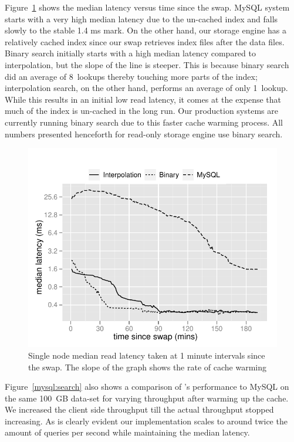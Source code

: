 Figure~\ref{search} shows the median latency versus time since the swap.
MySQL system starts with a very high median latency due to the un-cached
index and falls slowly to the stable 1.4 ms mark. On the other hand, our
storage engine has a relatively cached index since our swap retrieves index
files after the data files. Binary search initially starts with a high 
median latency compared to interpolation, but the slope of the line 
is steeper. This is because binary search did an average of 8~lookups 
thereby touching more parts of the index; interpolation search, on the 
other hand, performs an average of only 1~lookup. While this results 
in an initial low read latency, it comes at the expense that much of the 
index is un-cached in the long run. Our production systems are currently 
running binary search due to this faster cache warming process. All numbers 
presented henceforth for read-only storage engine use binary search.  

\begin{figure}
  \centering
    \includegraphics[scale=0.55]{images/search_1node.pdf}
  \caption{Single node median read latency taken at 1 minute intervals since the swap. The slope of the graph shows the rate of cache warming}
  \label{search}
\end{figure}

Figure~\ref{mysql:search} also shows a comparison of \projectname's
performance to MySQL on the same 100~GB data-set for varying 
throughput after warming up the cache. We increased the client 
side throughput till the actual throughput stopped increasing. 
As is clearly evident our implementation scales to around twice
the amount of queries per second while maintaining the median latency. 

